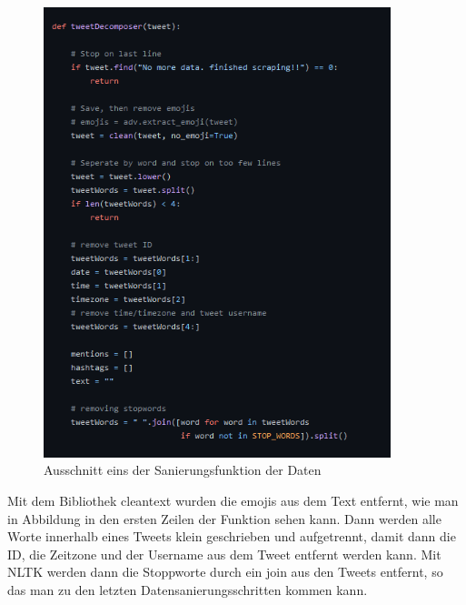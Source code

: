 	\begin{figure}[ht]
		\centering
		\includegraphics[width=0.9\textwidth]{images/Kapitel2/Code_Datensanierung_2}
		\caption{\label{fig:DataSanF1}Ausschnitt eins der Sanierungsfunktion der Daten}
	\end{figure}
	
	Mit dem Bibliothek cleantext wurden die emojis aus dem Text entfernt, wie man in Abbildung \label{DataSanF1} in den ersten Zeilen der Funktion sehen kann.
	Dann werden alle Worte innerhalb eines Tweets klein geschrieben und aufgetrennt, damit dann  die ID, die Zeitzone und der Username aus dem Tweet entfernt 
	werden kann. Mit NLTK werden dann die Stoppworte durch ein join aus den Tweets entfernt, so das man zu den letzten Datensanierungsschritten kommen kann.
	 
